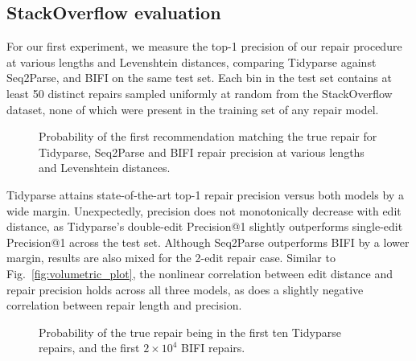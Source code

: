 \documentclass[sigplan,review,acmsmall,nonacm,screen,anonymous]{acmart}\settopmatter{printfolios=false,printccs=false,printacmref=false}
\begin{document}
\clearpage\subsection{StackOverflow evaluation}\label{sec:rq2}

For our first experiment, we measure the top-1 precision of our repair procedure at various lengths and Levenshtein distances, comparing Tidyparse against Seq2Parse, and BIFI on the same test set. Each bin in the test set contains at least 50 distinct repairs sampled uniformly at random from the StackOverflow dataset, none of which were present in the training set of any repair model.\vspace{-0.2cm}

\begin{figure}[h!]
\resizebox{.29\textwidth}{!}{}\hspace{0.5cm}
\resizebox{.29\textwidth}{!}{}\hspace{0.5cm}
\resizebox{.29\textwidth}{!}{}
\caption{Probability of the first recommendation matching the true repair for Tidyparse, Seq2Parse and BIFI repair precision at various lengths and Levenshtein distances.}\label{fig:len_dist_prec}
\end{figure}\vspace{-0.2cm}

Tidyparse attains state-of-the-art top-1 repair precision versus both models by a wide margin. Unexpectedly, precision does not monotonically decrease with edit distance, as Tidyparse's double-edit Precision@1 slightly outperforms single-edit Precision@1 across the test set. Although Seq2Parse outperforms BIFI by a lower margin, results are also mixed for the 2-edit repair case. Similar to Fig.~\ref{fig:volumetric_plot}, the nonlinear correlation between edit distance and repair precision holds across all three models, as does a slightly negative correlation between repair length and precision.

\begin{figure}
\vspace{-0.1cm}
\resizebox{.24\textwidth}{!}{}
\resizebox{.24\textwidth}{!}{}
\caption{Probability of the true repair being in the first ten Tidyparse repairs, and the first $2\times10^4$ BIFI repairs.}\label{fig:len_dist_prec_all}
\vspace{-0.3cm}
\end{figure}
\end{document}
